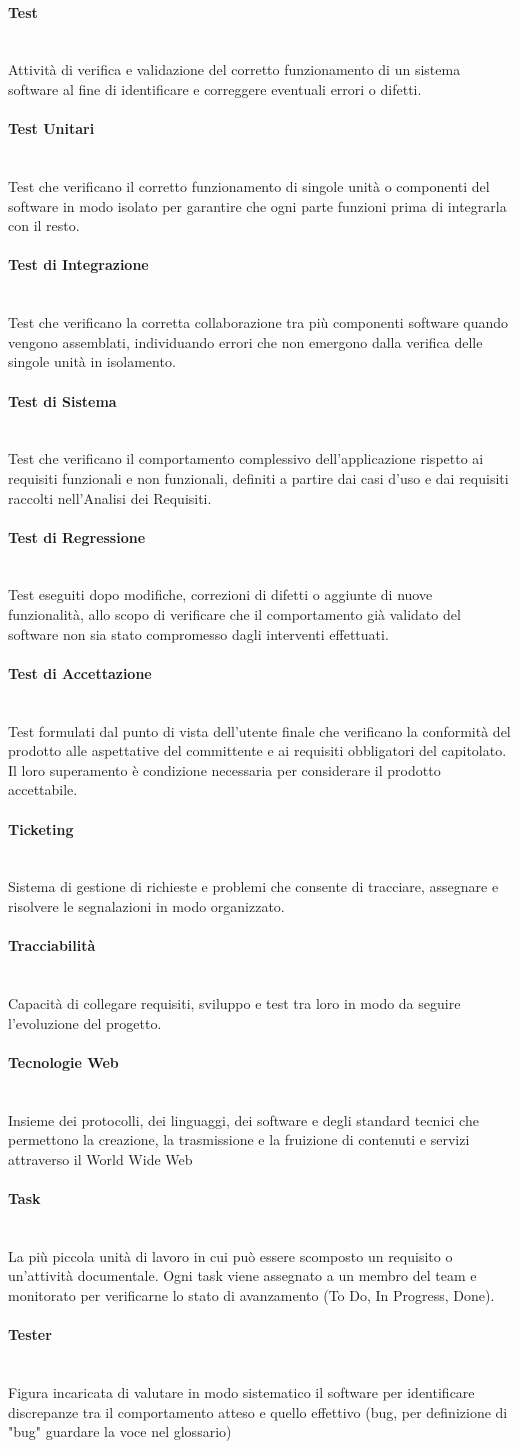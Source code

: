 \documentclass[a4paper, 10pt, colorlinks=true, linkcolor=black, urlcolor=blue, citecolor=blue, hidelinks]{article}
\newcommand{\glossaryterm}[2]{
    \paragraph{#1 \label{term:#1}} \mbox{} \\
    #2
    \vspace{0.5em}
}
\begin{document}
\glossaryterm{Test}{Attività di verifica e validazione del corretto funzionamento di un sistema software al fine di identificare e correggere eventuali errori o difetti.}

\glossaryterm{Test Unitari}{Test che verificano il corretto funzionamento di singole unità o componenti del software in modo isolato per garantire che ogni parte funzioni prima di integrarla con il resto.}

\glossaryterm{Test di Integrazione}{Test che verificano la corretta collaborazione tra più componenti software quando vengono assemblati, individuando errori che non emergono dalla verifica delle singole unità in isolamento.}

\glossaryterm{Test di Sistema}{Test che verificano il comportamento complessivo dell'applicazione rispetto ai requisiti funzionali e non funzionali, definiti a partire dai casi d'uso e dai requisiti raccolti nell'Analisi dei Requisiti.}

\glossaryterm{Test di Regressione}{Test eseguiti dopo modifiche, correzioni di difetti o aggiunte di nuove funzionalità, allo scopo di verificare che il comportamento già validato del software non sia stato compromesso dagli interventi effettuati.}

\glossaryterm{Test di Accettazione}{Test formulati dal punto di vista dell'utente finale che verificano la conformità del prodotto alle aspettative del committente e ai requisiti obbligatori del capitolato. Il loro superamento è condizione necessaria per considerare il prodotto accettabile.}

\glossaryterm{Ticketing}{Sistema di gestione di richieste e problemi che consente di tracciare, assegnare e risolvere le segnalazioni in modo organizzato.}

\glossaryterm{Tracciabilità}{Capacità di collegare requisiti, sviluppo e test tra loro in modo da seguire l'evoluzione del progetto.}

\glossaryterm{Tecnologie Web}{Insieme dei protocolli, dei linguaggi, dei software e degli standard tecnici che permettono la creazione, la trasmissione e la fruizione di contenuti e servizi attraverso il World Wide Web}

\glossaryterm{Task}{La più piccola unità di lavoro in cui può essere scomposto un requisito o un'attività documentale. Ogni task viene assegnato a un membro del team e monitorato per verificarne lo stato di avanzamento (To Do, In Progress, Done).}

\glossaryterm{Tester}{Figura incaricata di valutare in modo sistematico il software per identificare discrepanze tra il comportamento atteso e quello effettivo (bug, per definizione di "bug" guardare la voce nel glossario)}
\end{document}
